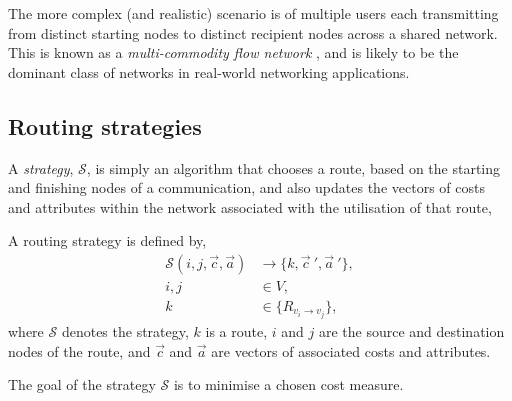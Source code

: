 The more complex (and realistic) scenario is of multiple users each transmitting from distinct starting nodes to distinct recipient nodes across a shared network. This is known as a \textit{multi-commodity flow network} \cite{???}, and is likely to be the dominant class of networks in real-world networking applications.

%
%

\subsection{Routing strategies} \label{sec:route_strats} 

A \textit{strategy}, $\mathcal{S}$, is simply an algorithm that chooses a route, based on the starting and finishing nodes of a communication, and also updates the vectors of costs and attributes within the network associated with the utilisation of that route,
\begin{definition}
A routing strategy is defined by,
	\begin{align}
\mathcal{S}(i,j,\vec{c},\vec{a}) &\to \{k,{\vec{c}}~',{\vec{a}}~'\}, \nonumber \\
i,j &\in V, \nonumber\\
k &\in \{R_{v_i\to v_j}\},
\end{align}
where $\mathcal{S}$ denotes the strategy, $k$ is a route, $i$ and $j$ are the source and destination nodes of the route, and $\vec{c}$ and $\vec{a}$ are vectors of associated costs and attributes.
\end{definition}
The goal of the strategy $\mathcal{S}$ is to minimise a chosen cost measure.

